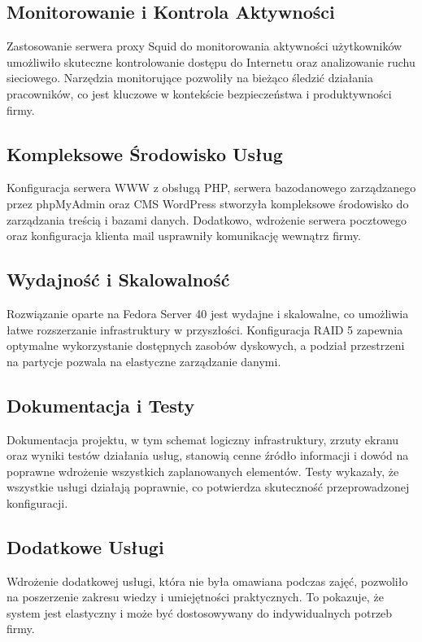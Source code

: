 \documentclass[a4paper]{article}
\begin{document}
\subsection{Monitorowanie i Kontrola Aktywności}
Zastosowanie serwera proxy Squid do monitorowania aktywności użytkowników umożliwiło skuteczne kontrolowanie dostępu do Internetu oraz analizowanie ruchu sieciowego. Narzędzia monitorujące pozwoliły na bieżąco śledzić działania pracowników, co jest kluczowe w kontekście bezpieczeństwa i produktywności firmy.

\subsection{Kompleksowe Środowisko Usług}
Konfiguracja serwera WWW z obsługą PHP, serwera bazodanowego zarządzanego przez phpMyAdmin oraz CMS WordPress stworzyła kompleksowe środowisko do zarządzania treścią i bazami danych. Dodatkowo, wdrożenie serwera pocztowego oraz konfiguracja klienta mail usprawniły komunikację wewnątrz firmy.

\subsection{Wydajność i Skalowalność}
Rozwiązanie oparte na Fedora Server 40 jest wydajne i skalowalne, co umożliwia łatwe rozszerzanie infrastruktury w przyszłości. Konfiguracja RAID 5 zapewnia optymalne wykorzystanie dostępnych zasobów dyskowych, a podział przestrzeni na partycje pozwala na elastyczne zarządzanie danymi.

\subsection{Dokumentacja i Testy}
Dokumentacja projektu, w tym schemat logiczny infrastruktury, zrzuty ekranu oraz wyniki testów działania usług, stanowią cenne źródło informacji i dowód na poprawne wdrożenie wszystkich zaplanowanych elementów. Testy wykazały, że wszystkie usługi działają poprawnie, co potwierdza skuteczność przeprowadzonej konfiguracji.

\subsection{Dodatkowe Usługi}
Wdrożenie dodatkowej usługi, która nie była omawiana podczas zajęć, pozwoliło na poszerzenie zakresu wiedzy i umiejętności praktycznych. To pokazuje, że system jest elastyczny i może być dostosowywany do indywidualnych potrzeb firmy.
\end{document}
